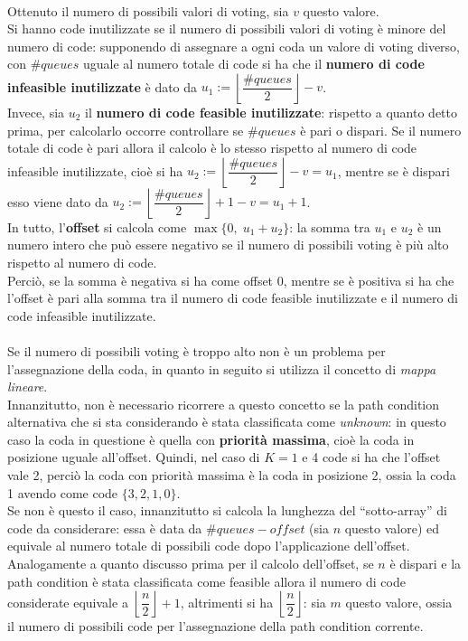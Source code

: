 \documentclass[a4paper, 12pt, oneside]{book}
\newcommand{\qq}[1]{``#1''}
\theoremstyle{normal}
\begin{document}
\\ Ottenuto il numero di possibili valori di voting, sia $v$ questo valore. \\ Si hanno code inutilizzate se il numero di possibili valori di voting è minore del numero di code: supponendo di assegnare a ogni coda un valore di voting diverso, con $\#queues$ uguale al numero totale di code si ha che il \textbf{numero di code infeasible inutilizzate} è dato da $u_1 := \left\lfloor \dfrac{\#queues}{2} \right\rfloor - v$. \\ Invece, sia $u_2$ il \textbf{numero di code feasible inutilizzate}: rispetto a quanto detto prima, per calcolarlo occorre controllare se $\#queues$ è pari o dispari. Se il numero totale di code è pari allora il calcolo è lo stesso rispetto al numero di code infeasible inutilizzate, cioè si ha $u_2 := \left\lfloor \dfrac{\#queues}{2} \right\rfloor - v = u_1$, mentre se è dispari esso viene dato da $u_2 := \left\lfloor \dfrac{\#queues}{2} \right\rfloor + 1 - v = u_1 + 1$. \\ In tutto, l'\textbf{offset} si calcola come $\max \{0, \; u_1 + u_2\}$: la somma tra $u_1$ e $u_2$ è un numero intero che può essere negativo se il numero di possibili voting è più alto rispetto al numero di code. \\ Perciò, se la somma è negativa si ha come offset 0, mentre se è positiva si ha che l'offset è pari alla somma tra il numero di code feasible inutilizzate e il numero di code infeasible inutilizzate. \\ \\ Se il numero di possibili voting è troppo alto non è un problema per l'assegnazione della coda, in quanto in seguito si utilizza il concetto di \emph{mappa lineare}. \\ Innanzitutto, non è necessario ricorrere a questo concetto se la path condition alternativa che si sta considerando è stata classificata come \emph{unknown}: in questo caso la coda in questione è quella con \textbf{priorità massima}, cioè la coda in posizione uguale all'offset. Quindi, nel caso di $K = 1$ e 4 code si ha che l'offset vale 2, perciò la coda con priorità massima è la coda in posizione 2, ossia la coda 1 avendo come code $\{ 3, 2, 1, 0 \}$. \\ Se non è questo il caso, innanzitutto si calcola la lunghezza del \qq{sotto-array} di code da considerare: essa è data da $\#queues - offset$ (sia $n$ questo valore) ed equivale al numero totale di possibili code dopo l'applicazione dell'offset. \\ Analogamente a quanto discusso prima per il calcolo dell'offset, se $n$ è dispari e la path condition è stata classificata come feasible allora il numero di code considerate equivale a $\left\lfloor \dfrac{n}{2} \right\rfloor + 1$, altrimenti si ha $\left\lfloor \dfrac{n}{2} \right\rfloor$: sia $m$ questo valore, ossia il numero di possibili code per l'assegnazione della path condition corrente.
\end{document}
